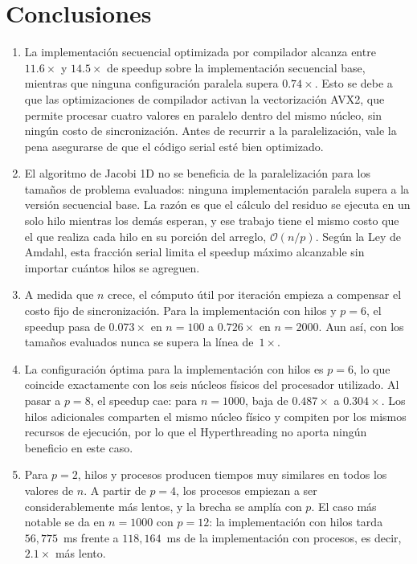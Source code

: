 
\section{Conclusiones}
\label{sec:Conclusiones}


\begin{enumerate}

    \item La implementación secuencial optimizada por compilador alcanza entre
    $11.6\times$ y $14.5\times$ de speedup sobre la implementación secuencial
    base, mientras que ninguna configuración paralela supera $0.74\times$. Esto
    se debe a que las optimizaciones de compilador activan la vectorización AVX2,
    que permite procesar cuatro valores en paralelo dentro del mismo núcleo, sin
    ningún costo de sincronización. Antes de recurrir a la paralelización, vale
    la pena asegurarse de que el código serial esté bien optimizado.

    \item El algoritmo de Jacobi 1D no se beneficia de la paralelización para
    los tamaños de problema evaluados: ninguna implementación paralela supera a
    la versión secuencial base. La razón es que el cálculo del residuo se
    ejecuta en un solo hilo mientras los demás esperan, y ese trabajo tiene el
    mismo costo que el que realiza cada hilo en su porción del arreglo,
    $\mathcal{O}(n/p)$. Según la Ley de Amdahl, esta fracción serial limita el
    speedup máximo alcanzable sin importar cuántos hilos se agreguen.

    \item A medida que $n$ crece, el cómputo útil por iteración empieza a
    compensar el costo fijo de sincronización. Para la implementación con hilos
    y $p=6$, el speedup pasa de $0.073\times$ en $n=100$ a $0.726\times$ en
    $n=2000$. Aun así, con los tamaños evaluados nunca se supera la línea
    de~$1\times$.

    \item La configuración óptima para la implementación con hilos es $p=6$,
    lo que coincide exactamente con los seis núcleos físicos del procesador
    utilizado. Al pasar a $p=8$, el speedup cae: para $n=1000$,
    baja de $0.487\times$ a $0.304\times$. Los hilos adicionales comparten el
    mismo núcleo físico y compiten por los mismos recursos de ejecución, por lo
    que el Hyperthreading no aporta ningún beneficio en este caso.

    \item Para $p=2$, hilos y procesos producen tiempos muy similares en todos
    los valores de $n$. A partir de $p=4$, los procesos empiezan a ser
    considerablemente más lentos, y la brecha se amplía con $p$. El caso más
    notable se da en $n=1000$ con $p=12$: la implementación con hilos tarda
    $56{,}775$~ms frente a $118{,}164$~ms de la implementación con procesos,
    es decir, $2.1\times$ más lento.


\end{enumerate}
